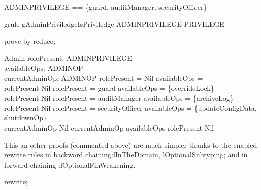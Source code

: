 \begin{zed}
ADMINPRIVILEGE == \{guard, auditManager, securityOfficer\}
\end{zed}

\begin{theorem}{grule gAdminPriviledgeIsPriviledge}
ADMINPRIVILEGE \in  \power  PRIVILEGE
\end{theorem}

\begin{zproof}[gAdminPriviledgeIsPriviledge]
prove by reduce;
\end{zproof}

\begin{schema}{Admin}
  rolePresent: \Optional ADMINPRIVILEGE\\
  availableOps: \power  ADMINOP\\
  currentAdminOp: \Optional ADMINOP
\where
  rolePresent = Nil \implies  availableOps = \emptyset\\
  rolePresent \neq  Nil \land  \The rolePresent = guard \implies  availableOps = \{overrideLock\}\\
  rolePresent \neq  Nil \land  \The rolePresent = auditManager \implies  availableOps = \{archiveLog\}\\
  rolePresent \neq  Nil \land  \The rolePresent = securityOfficer \implies  availableOps = \{updateConfigData, shutdownOp\}\\
  currentAdminOp \neq  Nil \implies  \The currentAdminOp \in  availableOps \land  rolePresent \neq  Nil
\end{schema}

This an other proofs (commented above) are much simpler thanks to
the enabled rewrite rules in backward chaining:lInTheDomain,
lOptionalSubtyping; and in forward chaining :lOptionalFinWeakening.
%
\begin{zproof}
rewrite;
\end{zproof}

